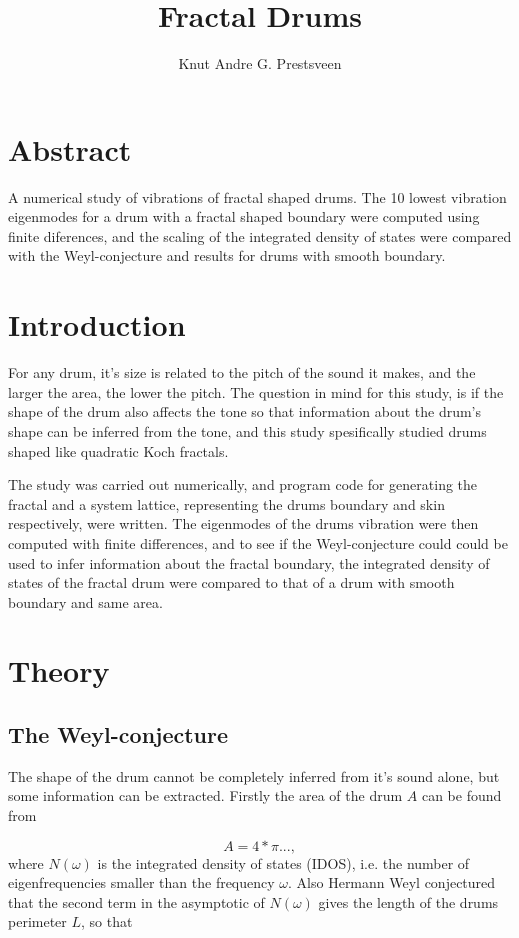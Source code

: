 \documentclass{article}
\title{Fractal Drums}
\author{Knut Andre G. Prestsveen}
\begin{document}
\maketitle

\section{Abstract}
A numerical study of vibrations of fractal shaped drums. The 10 lowest vibration eigenmodes for a drum with a   fractal shaped boundary were computed using finite diferences, and the scaling of the integrated density of states were compared with the Weyl-conjecture and results for drums with smooth boundary.

\section{Introduction}
For any drum, it's size is related to the pitch of the sound it makes, and the larger the area, the lower the pitch. The question in mind for this study, is if the shape of the drum also affects the tone so that information about the drum's shape can be inferred from the tone, and this study spesifically studied drums shaped like quadratic Koch fractals.

The study was carried out numerically, and program code for generating the fractal and a system lattice, representing the drums boundary and skin respectively, were written. The eigenmodes of the drums vibration were then computed with finite differences, and to see if the Weyl-conjecture could could be used to infer information about the fractal boundary, the integrated density of states of the fractal drum were compared to that of a drum with smooth boundary and same area.

\section{Theory}
\subsection{The Weyl-conjecture}
The shape of the drum cannot be completely inferred from it's sound alone, but some information can be extracted. Firstly the area of the drum $A$ can be found from

\begin{equation}
    \label{area}
    A = 4*\pi ...,
\end{equation}
where $N(\omega)$ is the integrated density of states (IDOS), i.e. the number of eigenfrequencies smaller than the frequency $\omega$. Also Hermann Weyl conjectured that the second term in the asymptotic of $N(\omega)$ gives the length of the drums perimeter $L$, so that
\end{document}
